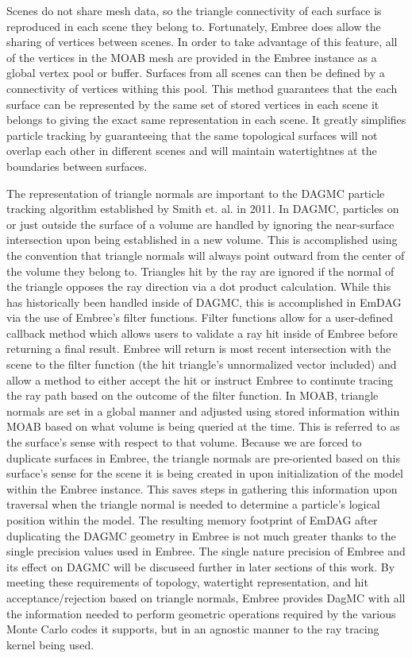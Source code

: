 \documentclass[10pt, a4paper]{article}
\begin{document}
Scenes do not share mesh data, so the triangle connectivity of each surface is reproduced in each scene they belong to. Fortunately, Embree does allow the sharing of vertices between scenes. In order to take advantage of this feature, all of the vertices in the MOAB mesh are provided in the Embree instance as a global vertex pool or buffer. Surfaces from all scenes can then be defined by a connectivity of vertices withing this pool. This method guarantees that the each surface can be represented by the same set of stored vertices in each scene it belongs to giving the exact same representation in each scene. It greatly simplifies particle tracking by guaranteeing that the same topological surfaces will not overlap each other in different scenes and will maintain watertightnes at the boundaries between surfaces.

The representation of triangle normals are important to the DAGMC particle tracking algorithm established by Smith et. al. \cite{smith_thesis} in 2011. In DAGMC, particles on or just outside the surface of a volume are handled by ignoring the near-surface intersection upon being established in a new volume. This is accomplished using the convention that triangle normals will always point outward from the center of the volume they belong to. Triangles hit by the ray are ignored if the normal of the triangle opposes the ray direction via a dot product calculation. While this has historically been handled inside of DAGMC, this is accomplished in EmDAG via the use of Embree's filter functions. Filter functions allow for a user-defined callback method which allows users to validate a ray hit inside of Embree before returning a final result. Embree will return is most recent intersection with the scene to the filter function (the hit triangle's unnormalized vector included) and allow a method to either accept the hit or instruct Embree to continute tracing the ray path based on the outcome of the filter function. In MOAB, triangle normals are set in a global manner and adjusted using stored information within MOAB based on what volume is being queried at the time. This is referred to as the surface's sense with respect to that volume. Because we are forced to duplicate surfaces in Embree, the triangle normals are pre-oriented based on this surface's sense for the scene it is being created in upon initialization of the model within the Embree instance. This saves steps in gathering this information upon traversal when the triangle normal is needed to determine a particle's logical position within the model. The resulting memory footprint of EmDAG after duplicating the DAGMC geometry in Embree is not much greater thanks to the single precision values used in Embree. The single nature precision of Embree and its effect on DAGMC will be discuseed further in later sections of this work.
By meeting these requirements of topology, watertight representation, and hit acceptance/rejection based on triangle normals, Embree provides DagMC with all the information needed to perform geometric operations required by the various Monte Carlo codes it supports, but in an agnostic manner to the ray tracing kernel being used.
\end{document}
